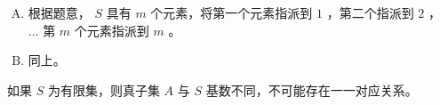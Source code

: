 {{        %
        \begin{practices}
            \begin{enumerate}[A.]
                \item
                {
                    根据题意， $S$ 具有 $m$ 个元素，将第一个元素指派到 $1$ ，第二个指派到 $2$ ， $...$ 第 $m$ 个元素指派到 $m$ 。
                }
                \item
                {
                    同上。
                }
            \end{enumerate}
        \end{practices}

        \begin{practices}
            如果 $S$ 为有限集，则真子集 $A$ 与 $S$ 基数不同，不可能存在一一对应关系。
        \end{practices}
    }
}
